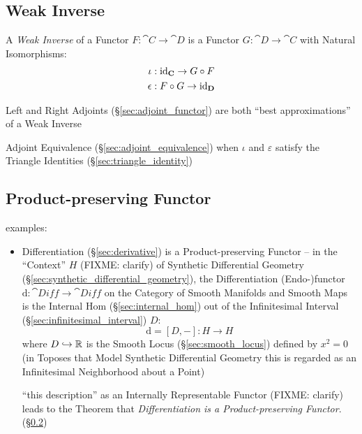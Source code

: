 \subsection{Weak Inverse}\label{sec:weak_inverse}

A \emph{Weak Inverse} of a Functor $F : \cat{C} \rightarrow \cat{D}$
is a Functor $G : \cat{D} \rightarrow \cat{C}$ with Natural
Isomorphisms:
\begin{align*}
  \iota &: \mathrm{id}_\mathbf{C} \rightarrow G \circ F \\
  \epsilon &: F \circ G \rightarrow \mathrm{id}_\mathbf{D}
\end{align*}

Left and Right Adjoints (\S\ref{sec:adjoint_functor}) are both ``best
approximations'' of a Weak Inverse

Adjoint Equivalence (\S\ref{sec:adjoint_equivalence}) when $\iota$ and
$\varepsilon$ satisfy the Triangle Identities
(\S\ref{sec:triangle_identity})



\subsection{Product-preserving Functor}
\label{sec:product_preserving_functor}

examples:
\begin{itemize}
\item Differentiation (\S\ref{sec:derivative}) is a Product-preserving Functor
  -- in the ``Context'' $H$ (FIXME: clarify) of Synthetic Differential Geometry
  (\S\ref{sec:synthetic_differential_geometry}), the Differentiation
  (Endo-)functor $\mathrm{d} : \cat{Diff} \rightarrow \cat{Diff}$ on the
  Category of Smooth Manifolds and Smooth Maps is the Internal Hom
  (\S\ref{sec:internal_hom}) out of the Infinitesimal Interval
  (\S\ref{sec:infinitesimal_interval}) $D$:
  \[
    \mathrm{d} = [D,-] : H \rightarrow H
  \]
  where $D \hookrightarrow \mathbb{R}$ is the Smooth Locus
  (\S\ref{sec:smooth_locus}) defined by $x^2 = 0$ (in Toposes that Model
  Synthetic Differential Geometry this is regarded as an Infinitesimal
  Neighborhood about a Point)

  ``this description'' as an Internally Representable Functor (FIXME: clarify)
  leads to the Theorem that \emph{Differentiation is a Product-preserving
    Functor}. (\S\ref{sec:product_preserving_functor})
\end{itemize}


